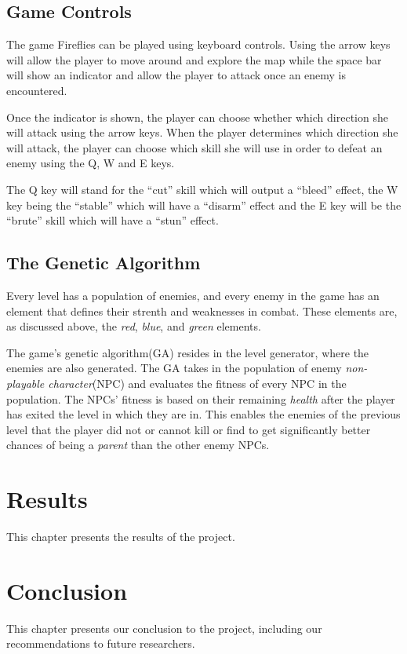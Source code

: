 \documentclass[11pt,a4paper,twocolumn]{article}
\begin{document}
\subsection{Game Controls}
The game Fireflies can be played using keyboard controls. Using the arrow keys will allow the player to move around and explore the map while the space bar will show an indicator and allow the player to attack once an enemy is encountered. 

Once the indicator is shown, the player can choose whether which direction she will attack using the arrow keys. When the player determines which direction she will attack, the player can choose which skill she will use in order to defeat an enemy using the Q, W and E keys. 

The Q key will stand for the “cut” skill which will output a “bleed” effect, the W key being the “stable” which will have a “disarm” effect and the E key will be the “brute” skill which will have a “stun” effect.


\subsection{The Genetic Algorithm}

Every level has a population of enemies, and every enemy in the game has an element that defines their strenth and weaknesses in combat. These elements are, as discussed above, the {\em red}, {\em blue}, and {\em green} elements.

The game's genetic algorithm(GA) resides in the level generator, where the enemies are also generated. The GA takes in the population of enemy {\em non-playable character}(NPC) and evaluates the fitness of every NPC in the population. The NPCs' fitness is based on their remaining {\em health} after the player has exited the level in which they are in. This enables the enemies of the previous level that the player did not or cannot kill or find to get significantly better chances of being a {\em parent} than the other enemy NPCs.

\section{Results}
This chapter presents the results of the project.

\section{Conclusion}
This chapter presents our conclusion to the project, including our recommendations to future researchers.





\end{document}
